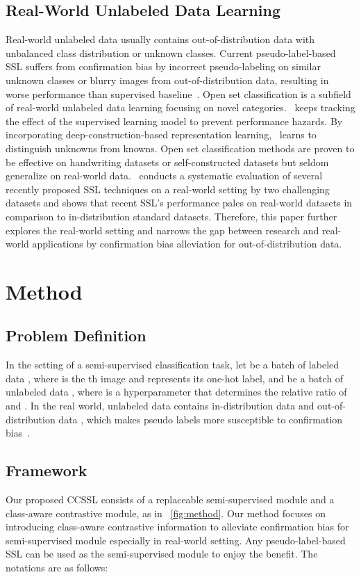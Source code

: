 \documentclass[10pt,twocolumn,letterpaper]{article}
\begin{document}
\subsection{Real-World Unlabeled Data Learning}
Real-world unlabeled data usually contains out-of-distribution data with unbalanced class distribution or unknown classes. Current pseudo-label-based SSL suffers from confirmation bias by incorrect pseudo-labeling on similar unknown classes or blurry images from out-of-distribution data, resulting in worse performance than supervised baseline~\cite{su2021realistic}. Open set classification is a subfield of real-world unlabeled data learning focusing on novel categories.~\cite{guo2020safe} keeps tracking the effect of the supervised learning model to prevent performance hazards. By incorporating deep-construction-based representation learning,~\cite{yoshihashi2019classification} learns to distinguish unknowns from knowns. Open set classification methods are proven to be effective on handwriting datasets or self-constructed datasets but seldom generalize on real-world data.~\cite{su2021realistic} conducts a systematic evaluation of several recently proposed SSL techniques on a real-world setting by two challenging datasets and shows that recent SSL's performance pales on real-world datasets in comparison to in-distribution standard datasets. Therefore, this paper further explores the real-world setting and narrows the gap between research and real-world applications by confirmation bias alleviation for out-of-distribution data. 
\section{Method}

\label{sec:method}
\subsection{Problem Definition}
In the setting of a semi-supervised classification task, let  be a batch of labeled data , where  is the th image and  represents its one-hot label, and  be a batch of unlabeled data , where  is a hyperparameter that determines the relative ratio of   and . In the real world, unlabeled data  contains in-distribution data  and out-of-distribution data ,  which makes pseudo labels more susceptible to confirmation bias~\cite{nassar2021labels}.

\subsection{Framework}
Our proposed CCSSL consists of a replaceable semi-supervised module and a class-aware contrastive module, as in ~\cref{fig:method}. Our method focuses on introducing class-aware contrastive information to alleviate confirmation bias for semi-supervised module especially in real-world setting. Any pseudo-label-based SSL can be used as the semi-supervised module to enjoy the benefit. The notations are as follows:
\end{document}
